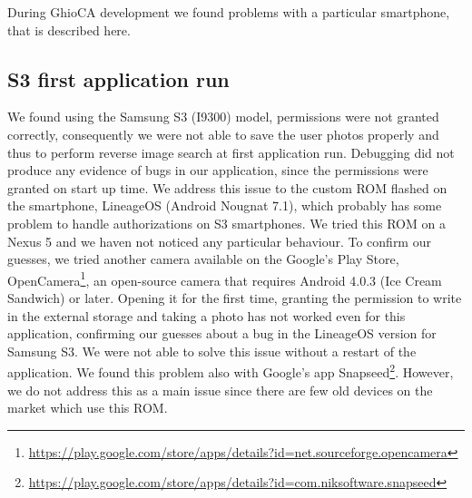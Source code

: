 During GhioCA development we found problems with a particular smartphone, that 
is described here.

\subsection{S3 first application run}

We found using the Samsung S3 (I9300) model, permissions were not granted 
correctly, consequently we were not able to save the user photos properly and 
thus to perform reverse image search at first application run. Debugging did not 
produce any evidence of bugs in our application, since the permissions were 
granted on start up time.
We address this issue to the custom ROM flashed on the smartphone, LineageOS 
(Android Nougnat 7.1), which probably has some problem to handle authorizations 
on S3 smartphones. We tried this ROM on a Nexus 5 and we haven not noticed any 
particular behaviour.
To confirm our guesses, we tried another camera available on the Google's Play 
Store, 
OpenCamera\footnote{\url{
https://play.google.com/store/apps/details?id=net.sourceforge.opencamera}}, an 
open-source camera that requires Android 4.0.3 (Ice Cream Sandwich) or later.
Opening it for the first time, granting the permission to write in the external 
storage and taking a photo has not worked even for this application, confirming 
our guesses about a bug in the LineageOS version for Samsung S3.
We were not able to solve this issue without a restart of the application. We 
found this problem also with Google's app 
Snapseed\footnote{\url{
https://play.google.com/store/apps/details?id=com.niksoftware.snapseed}}.
However, we do not address this as a main issue since there are few old devices 
on the market which use this ROM.
